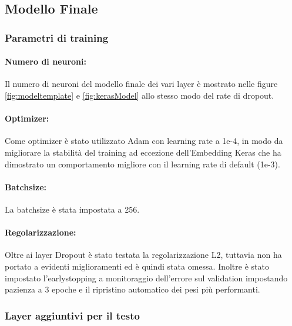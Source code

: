 \subsection{Modello Finale}
\subsubsection{Parametri di training}

\paragraph{Numero di neuroni:} Il numero di neuroni del modello finale dei vari
layer è mostrato nelle figure \ref{fig:modeltemplate} e \ref{fig:kerasModel}
allo stesso modo del rate di dropout.

\paragraph{Optimizer:} Come optimizer è stato utilizzato Adam con learning rate
a 1e-4, in modo da migliorare la stabilità del training ad eccezione
dell'Embedding Keras che ha dimostrato un comportamento migliore con il learning
rate di default (1e-3).

\paragraph{Batchsize:} La batchsize è stata impostata a 256.

\paragraph{Regolarizzazione:} Oltre ai layer Dropout è stato testata la
regolarizzazione L2, tuttavia non ha portato a evidenti miglioramenti ed è
quindi stata omessa. Inoltre è stato impostato l'earlystopping a monitoraggio
dell'errore sul validation impostando pazienza a 3 epoche e il ripristino
automatico dei pesi più performanti.

\subsubsection{Layer aggiuntivi per il testo}

